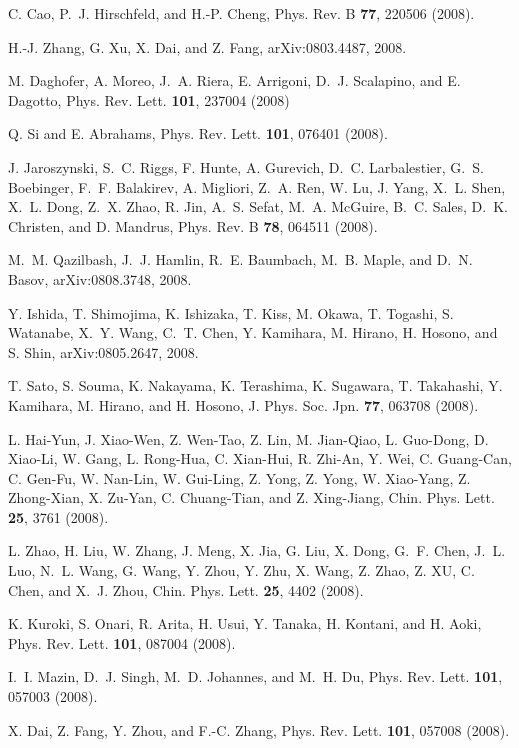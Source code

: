 \documentclass[aps,prb,superscriptaddress,preprintnumbers,
showpacs,legalpaper,twoside,twocolumn,amsmath,amssymb]{revtex4}
\begin{document}
\begin{thebibliography}{10}
C. Cao, P.~J. Hirschfeld, and H.-P. Cheng, Phys. Rev. B {\bf 77},  220506
  (2008).

H.-J. Zhang, G. Xu, X. Dai, and Z. Fang, arXiv:0803.4487, 2008.

M. Daghofer, A. Moreo, J.~A. Riera, E. Arrigoni, D.~J. Scalapino, and E.
  Dagotto, Phys. Rev. Lett. {\bf 101}, 237004 (2008)

Q. Si and E. Abrahams, Phys. Rev. Lett. {\bf 101},  076401  (2008).

J. Jaroszynski, S.~C. Riggs, F. Hunte, A. Gurevich, D.~C. Larbalestier, G.~S.
  Boebinger, F.~F. Balakirev, A. Migliori, Z.~A. Ren, W. Lu, J. Yang, X.~L.
  Shen, X.~L. Dong, Z.~X. Zhao, R. Jin, A.~S. Sefat, M.~A. McGuire, B.~C.
  Sales, D.~K. Christen, and D. Mandrus, Phys. Rev. B {\bf 78},  064511
  (2008).

M.~M. Qazilbash, J.~J. Hamlin, R.~E. Baumbach, M.~B. Maple, and D.~N. Basov,
  arXiv:0808.3748, 2008.

Y. Ishida, T. Shimojima, K. Ishizaka, T. Kiss, M. Okawa, T. Togashi, S.
  Watanabe, X.~Y. Wang, C.~T. Chen, Y. Kamihara, M. Hirano, H. Hosono, and S.
  Shin, arXiv:0805.2647, 2008.

T. Sato, S. Souma, K. Nakayama, K. Terashima, K. Sugawara, T. Takahashi, Y.
  Kamihara, M. Hirano, and H. Hosono, J. Phys. Soc. Jpn. {\bf 77},  063708
  (2008).

L. Hai-Yun, J. Xiao-Wen, Z. Wen-Tao, Z. Lin, M. Jian-Qiao, L. Guo-Dong, D.
  Xiao-Li, W. Gang, L. Rong-Hua, C. Xian-Hui, R. Zhi-An, Y. Wei, C. Guang-Can,
  C. Gen-Fu, W. Nan-Lin, W. Gui-Ling, Z. Yong, Z. Yong, W. Xiao-Yang, Z.
  Zhong-Xian, X. Zu-Yan, C. Chuang-Tian, and Z. Xing-Jiang, Chin. Phys. Lett.
  {\bf 25},  3761  (2008).

L. Zhao, H. Liu, W. Zhang, J. Meng, X. Jia, G. Liu, X. Dong, G.~F. Chen, J.~L.
  Luo, N.~L. Wang, G. Wang, Y. Zhou, Y. Zhu, X. Wang, Z. Zhao, Z. XU, C. Chen,
  and X.~J. Zhou, Chin. Phys. Lett. {\bf 25},  4402  (2008).

K. Kuroki, S. Onari, R. Arita, H. Usui, Y. Tanaka, H. Kontani, and H. Aoki,
  Phys. Rev. Lett. {\bf 101},  087004  (2008).

I.~I. Mazin, D.~J. Singh, M.~D. Johannes, and M.~H. Du, Phys. Rev. Lett. {\bf
  101},  057003  (2008).

X. Dai, Z. Fang, Y. Zhou, and F.-C. Zhang, Phys. Rev. Lett. {\bf 101},  057008
  (2008).


\end{thebibliography}
\end{document}
